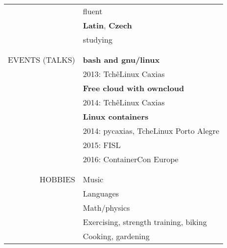 \begin{tabular}{rp{12cm}}
    & fluent \\
    & \textbf{Latin}, \textbf{Czech} \\
    & studying
    \\\\ \hline \\
    \uppercase{Events (talks)}
    & \textbf{bash and gnu/linux} \\
    & 2013: TchêLinux Caxias \\
    & \textbf{Free cloud with owncloud} \\
    & 2014: TchêLinux Caxias \\
    & \textbf{Linux containers} \\
    & 2014: pycaxias, TcheLinux Porto Alegre \\
    & 2015: FISL \\
    & 2016: ContainerCon Europe
    \\\\ \hline \\
    \uppercase{Hobbies}
    & Music \\
    & Languages \\
    & Math/physics \\
    & Exercising, strength training, biking \\
    & Cooking, gardening
\end{tabular}
